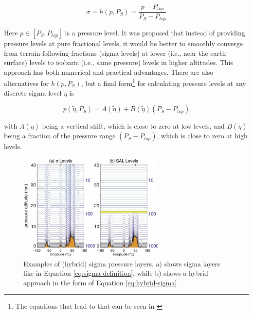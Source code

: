 \begin{equation}
\label{eq:sigma-definition}
\sigma = h(p,P_S) = \frac{p - P_{top}}{P_S - P_{top}}
\end{equation}

Here $p \in [P_S, P_{top}]$ is a pressure level. 
It was proposed that instead of providing pressure levels at pure fractional levels, it would be better to smoothly converge from terrain following fractions (sigma levels) at lower (i.e., near the earth surface) levels to isobaric (i.e., same pressure) levels in higher altitudes. 
This approach has both numerical and practical advantages.
There are also alternatives for $h(p, P_S)$, but a final form\footnote{The equations that lead to that can be seen in \cite{eckermann_hybrid_2009}} for calculating pressure levels at any discrete sigma level $\tilde{\eta}$ is

\begin{equation}
\label{eq:hybrid-sigma}
p(\tilde{\eta}, P_S) = A(\tilde{\eta}) + B(\tilde{\eta}) (P_S - P_{top})
\end{equation}


with $A(\tilde{\eta})$ being a vertical shift, which is close to zero at low levels, and $B(\tilde{\eta})$ being a fraction of the pressure range $(P_S - P_{top})$, which is close to zero at high levels. 

\begin{figure}
  \begin{center}
    \includegraphics[width=0.65\textwidth]{figures/hybrid_sigma_pressure_layers.png}
  \end{center}
  \caption{Examples of (hybrid) sigma pressure layers. a) shows sigma layers like in Equation \ref{eq:sigma-definition}, while b) shows a hybrid approach in the form of Equation \ref{eq:hybrid-sigma} \cite{eckermann_hybrid_2009}}\label{fig:hybrid-sigma}
\end{figure}



